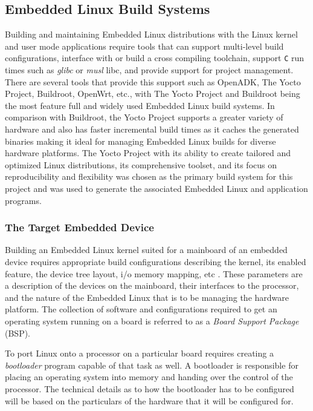 \subsection{Embedded Linux Build Systems}

Building and maintaining Embedded Linux distributions with the Linux kernel and user mode applications require tools that can support multi-level build configurations, interface with or build a cross compiling toolchain, support \texttt{C} run times such as \textit{glibc} or \textit{musl} libc, and provide support for project management. There are several tools that provide this support such as OpenADK, The Yocto Project, Buildroot, OpenWrt, etc., with The Yocto Project and Buildroot being the most feature full and widely used Embedded Linux build systems. In comparison with Buildroot, the Yocto Project supports a greater variety of hardware and also has faster incremental build times as it caches the generated binaries \cite{yocto} making it ideal for managing Embedded Linux builds for diverse hardware platforms. The Yocto Project with its ability to create tailored and optimized Linux distributions, its comprehensive toolset, and its focus on reproducibility and flexibility was chosen as the primary build system for this project and was used to generate the associated Embedded Linux and application programs.

\subsubsection{The Target Embedded Device}

Building an Embedded Linux kernel suited for a mainboard of an embedded device requires appropriate build configurations describing the kernel, its enabled feature, the device tree layout, i/o memory mapping, etc \cite{bootlin-port}. These parameters are a description of the devices on the mainboard, their interfaces to the processor, and the nature of the Embedded Linux that is to be managing the hardware platform. The collection of software and configurations required to get an operating system running on a board is referred to as a \textit{Board Support Package} (BSP).

To port Linux onto a processor on a particular board requires creating a \textit{bootloader} program capable of that task as well. A bootloader is responsible for placing an operating system into memory and handing over the control of the processor. The technical details as to how the bootloader has to be configured will be based on the particulars of the hardware that it will be configured for.

